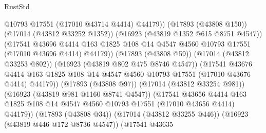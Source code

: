 \begin{lexlean}{RustStd}
\begin{coremodule}
                                      @10793
                                      @17551
                                      (@17010 @43714 @4414)
                                      @44179))
                                  (@17893 (@43808 @150))
                                  (@17014 (@43812 @33252 @1352))
                                  (@16923 (@43819 @1352 @615 @8751 @4547))
                                  (@17541
                                    @43696
                                    @4414
                                    @163
                                    @1825
                                    @108
                                    @14
                                    @4547
                                    @4560
                                    @10793
                                    @17551
                                    (@17010 @43696 @4414)
                                    @44179))
                                (@17893 (@43808 @59))
                                (@17014 (@43812 @33253 @802))
                                (@16923 (@43819 @802 @475 @8746 @4547))
                                (@17541
                                  @43676
                                  @4414
                                  @163
                                  @1825
                                  @108
                                  @14
                                  @4547
                                  @4560
                                  @10793
                                  @17551
                                  (@17010 @43676 @4414)
                                  @44179))
                              (@17893 (@43808 @97))
                              (@17014 (@43812 @33254 @981))
                              (@16923 (@43819 @981 @1160 @8741 @4547))
                              (@17541
                                @43656
                                @4414
                                @163
                                @1825
                                @108
                                @14
                                @4547
                                @4560
                                @10793
                                @17551
                                (@17010 @43656 @4414)
                                @44179))
                            (@17893 (@43808 @34))
                            (@17014 (@43812 @33255 @446))
                            (@16923 (@43819 @446 @172 @8736 @4547))
                            (@17541
                              @43635

\end{coremodule}
\end{lexlean}
